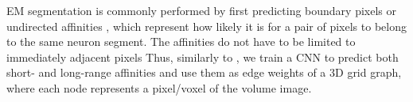 EM segmentation is commonly performed by first predicting 
boundary pixels \cite{beier2017multicut,ciresan2012deep} or undirected affinities \cite{wolf2018mutex,lee2017superhuman,funke2018large}, which represent how likely it is for a pair of pixels to belong to the same neuron segment. 
The affinities do not have to be limited to immediately adjacent pixels
Thus, similarly to \cite{lee2017superhuman}, we train a CNN to predict both short- and long-range affinities
and use them as edge weights of a 3D grid graph, where each node represents a pixel/voxel of the volume image. 


